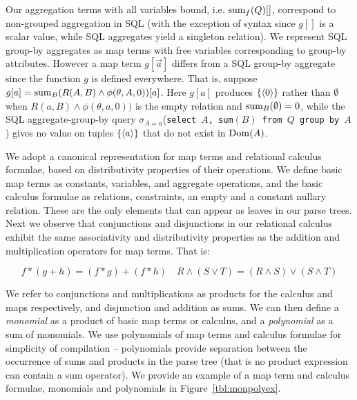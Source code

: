 Our aggregation terms with all variables bound, i.e. $\mathrm{sum}_{f}(Q)[]$,
correspond to non-grouped aggregation in SQL (with the exception of syntax since
$g[]$ is a scalar value, while SQL aggregates yield a singleton relation).  We
represent SQL group-by aggregates as map terms with free variables corresponding
to group-by attributes. However a map term $g[\vec{a}]$
differs from a SQL group-by aggregate since the function $g$ is defined everywhere.
That is, suppose $g[a] = \mathrm{sum}_{B}(R(A,B) \wedge \phi(\theta,A,0))[a]$. Here $g[a]$
produces $\{{\langle0\rangle}\}$ rather than $\emptyset$ when
$R(a,B) \wedge \phi(\theta,a,0))$ is the empty relation and
$\mathrm{sum}_{B}(\emptyset) = 0$, while the SQL aggregate-group-by query
$\sigma_{A=a}$(\texttt{select $A$, sum$(B)$ from $Q$ group by $A$})
gives no value on tuples $\{{\langle a\rangle}\}$ that do not exist in $\mathrm{Dom}(A)$.


We adopt a canonical representation for map terms and relational calculus
formulae, based on distributivity properties of their operations. We define
basic map terms as constants, variables, and aggregate operations, and the basic
calculus formulae as relations, constraints, an empty and a constant
nullary relation. These are the only elements that can appear as leaves in our
parse trees. Next we observe that conjunctions and disjunctions in our relational
calculus exhibit the same associativity and distributivity properties as the
addition and multiplication operators for map terms. That is:

\[
f*(g+h) = (f*g) + (f*h)
\quad
R \wedge(S \vee T) = (R \wedge S) \vee (S \wedge T)
\]


We refer to conjunctions and multiplications as products for the calculus and
maps respectively, and disjunction and addition as sums.  We can then define a
\textit{monomial} as a product of basic map terms or calculus, and a
\textit{polynomial} as a sum of monomials. We use polynomials of map terms and
calculus formulae for simplicity of compilation -- polynomials provide
separation between the occurrence of sums and products in the parse tree (that
is no product expression can contain a sum operator).  We provide an example of
a map term and calculus formulae, monomials and polynomials in
Figure~\ref{tbl:monpolyex}.

